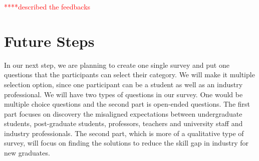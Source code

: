 \documentclass{sigchi}
\begin{document}
\textcolor{red}{****described the feedbacks}


 \section{Future Steps}
In our next step, we are planning to create one single survey and put one questions that the participants can select their category. We will make it multiple selection option, since one participant can be a student as well as an industry professional.
We will have two types of questions in our survey. One would be multiple choice questions and the second part is open-ended questions. The first part focuses on discovery the misaligned expectations between undergraduate students, post-graduate students, professors, teachers and university staff and industry professionals. The second part, which is more of a qualitative type of survey, will focus on finding the solutions to reduce the skill gap in industry for new graduates.  
  

\balance{}

\balance{}



\end{document}
